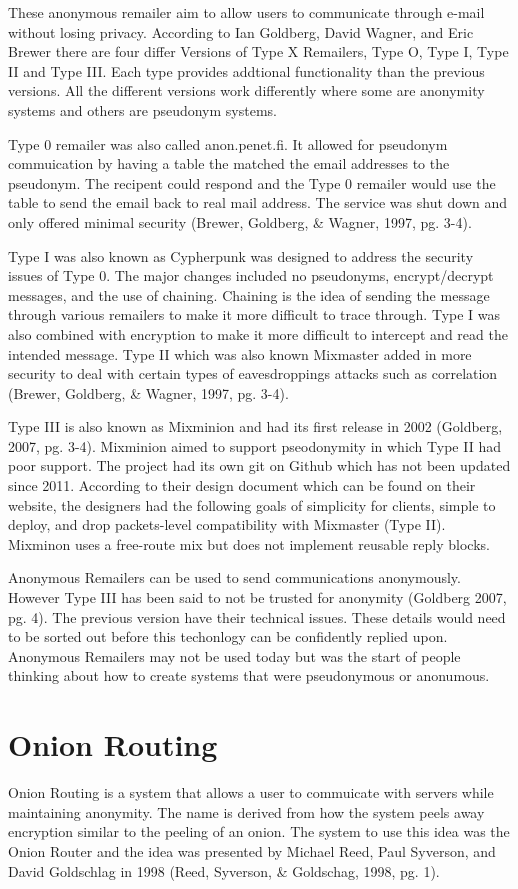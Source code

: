 \documentclass[12pt]{article}
\begin{document}
These anonymous remailer aim to allow users to communicate through e-mail without losing privacy. According to Ian Goldberg, David Wagner, and Eric Brewer there are four differ Versions of Type X Remailers, Type O, Type I, Type II and Type III. Each type provides addtional functionality than the previous versions. All the different versions work differently where some are anonymity systems and others are pseudonym systems.

Type 0 remailer was also called anon.penet.fi. It allowed for pseudonym commuication by having a table the matched the email addresses to the pseudonym. The recipent could respond and the Type 0 remailer would use the table to send the email back to real mail address. The service was shut down and only offered minimal security (Brewer, Goldberg, \& Wagner, 1997, pg. 3-4).

Type I was also known as Cypherpunk was designed to address the security issues of Type 0. The major changes included no pseudonyms, encrypt/decrypt messages, and the use of chaining. Chaining is the idea of sending the message through various remailers to make it more difficult to trace through. Type I was also combined with encryption to make it more difficult to intercept and read the intended message. Type II which was also known  Mixmaster added in more security to deal with certain types of eavesdroppings attacks such as correlation (Brewer, Goldberg, \& Wagner, 1997, pg. 3-4).

Type III is also known as Mixminion and had its first release in 2002 (Goldberg, 2007, pg. 3-4). Mixminion aimed to support pseodonymity in which Type II had poor support. The project had its own git on Github which has not been updated since 2011. According to their design document which can be found on their website, the designers had the following goals of simplicity for clients, simple to deploy, and drop packets-level compatibility with Mixmaster (Type II).  Mixminon uses a free-route mix but does not implement reusable reply blocks.

Anonymous Remailers can be used to send communications anonymously. However Type III  has been said to not be trusted for anonymity (Goldberg 2007, pg. 4). The previous version have their technical issues. These details would need to be sorted out before this techonlogy can be confidently replied upon. Anonymous Remailers may not be used today but was the start of people thinking about how to create systems that were pseudonymous or anonumous.

\section{Onion Routing}\label{}
Onion Routing is a system that allows a user to commuicate with servers while maintaining anonymity. The name is derived from how the system peels away encryption similar to the peeling of an onion. The system to use this idea was the Onion Router and the idea was presented by Michael Reed, Paul Syverson, and David  Goldschlag in 1998 (Reed, Syverson, \& Goldschag, 1998, pg. 1). 
\end{document}
